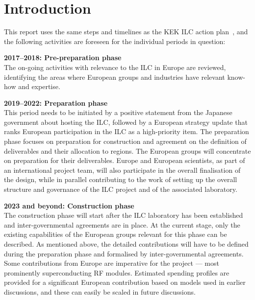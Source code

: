 \documentclass[%
 reprint,
 amsmath,amssymb,
 aps,
]{revtex4-1}
\begin{document}
\section{\label{sec:intro}Introduction}
This report uses the same steps and timelines as the  KEK ILC action plan~\cite{kekactionplan}, and the following activities are foreseen for the individual periods in question:
\begin{description}
\item{\bfseries 2017--2018: Pre-preparation phase}\\ 
The on-going activities with relevance to the ILC in Europe are reviewed, 
identifying the areas where European groups and industries have relevant know-how and expertise. 


\item{\bfseries 2019--2022: Preparation phase}\\
This period needs to be initiated by a positive statement 
from the Japanese government about hosting the ILC, followed by a European 
strategy update that ranks European participation in the ILC as a high-priority item. 
The preparation phase focuses on preparation for construction and agreement on the definition of deliverables and their allocation to regions. 
The European groups will concentrate on preparation for their deliverables. Europe and European scientists, as part of an 
international project team, will also participate 
in the overall finalisation of the design, while in parallel contributing  
to the work of setting up the overall structure and governance of the ILC project 
and of the associated laboratory. 

\item{\bfseries 2023 and beyond: Construction phase}\\
The construction phase will start after the ILC laboratory has been established and inter-governmental agreements are in place.
At the current stage, only the existing capabilities of the European groups relevant for this phase can be described. As mentioned above, the detailed contributions will have to be defined 
during the preparation phase and formalised by inter-governmental agreements.
Some contributions from Europe are imperative for the project --- most prominently superconducting RF modules. Estimated spending profiles are provided 
for a significant European contribution based on models used in earlier discussions, and these can easily be scaled in 
future discussions.

\end{description}
\end{document}
